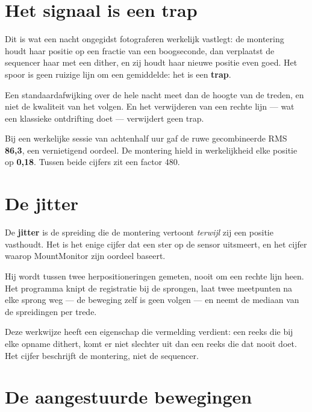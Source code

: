 \section{Het signaal is een trap}

Dit is wat een nacht ongegidst fotograferen werkelijk vastlegt: de montering
houdt haar positie op een fractie van een boogseconde, dan verplaatst de
sequencer haar met een dither, en zij houdt haar nieuwe positie even goed. Het
spoor is geen ruizige lijn om een gemiddelde: het is een \textbf{trap}.

Een standaardafwijking over de hele nacht meet dan de hoogte van de treden, en
niet de kwaliteit van het volgen. En het verwijderen van een rechte lijn ---
wat een klassieke ontdrifting doet --- verwijdert geen trap.

\begin{info}
Bij een werkelijke sessie van achtenhalf uur gaf de ruwe gecombineerde RMS
\textbf{86,3\arcsec}, een vernietigend oordeel. De montering hield in
werkelijkheid elke positie op \textbf{0,18\arcsec}. Tussen beide cijfers zit
een factor 480.
\end{info}

\section{De jitter}

De \textbf{jitter} is de spreiding die de montering vertoont \emph{terwijl} zij
een positie vasthoudt. Het is het enige cijfer dat een ster op de sensor
uitsmeert, en het cijfer waarop MountMonitor zijn oordeel baseert.

Hij wordt tussen twee herpositioneringen gemeten, nooit om een rechte lijn
heen. Het programma knipt de registratie bij de sprongen, laat twee meetpunten
na elke sprong weg --- de beweging zelf is geen volgen --- en neemt de mediaan
van de spreidingen per trede.

\begin{tip}
Deze werkwijze heeft een eigenschap die vermelding verdient: een reeks die bij
elke opname dithert, komt er niet slechter uit dan een reeks die dat nooit
doet. Het cijfer beschrijft de montering, niet de sequencer.
\end{tip}

\section{De aangestuurde bewegingen}


